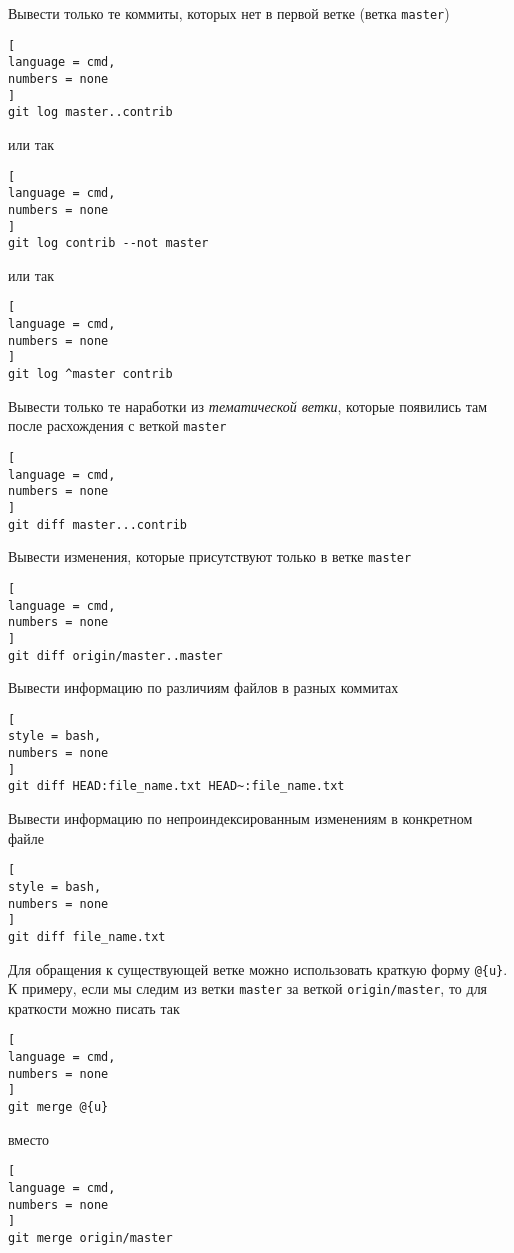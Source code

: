 \documentclass[%
	11pt,
	a4paper,
	utf8,
		]{article}
\begin{document}
Вывести только те коммиты, которых нет в первой ветке (ветка \texttt{master})

\begin{lstlisting}[
language = cmd,
numbers = none
]
git log master..contrib
\end{lstlisting}
или так
\begin{lstlisting}[
language = cmd,
numbers = none
]
git log contrib --not master
\end{lstlisting}
или так
\begin{lstlisting}[
language = cmd,
numbers = none
]
git log ^master contrib
\end{lstlisting}


Вывести только те наработки из \emph{тематической ветки}, которые появились там после расхождения с веткой \texttt{master}

\begin{lstlisting}[
language = cmd,
numbers = none
]
git diff master...contrib
\end{lstlisting}

Вывести изменения, которые присутствуют только в ветке \texttt{master}

\begin{lstlisting}[
language = cmd,
numbers = none
]
git diff origin/master..master
\end{lstlisting}

Вывести информацию по различиям файлов в разных коммитах
\begin{lstlisting}[
style = bash,
numbers = none
]
git diff HEAD:file_name.txt HEAD~:file_name.txt
\end{lstlisting}

Вывести информацию по непроиндексированным изменениям в конкретном файле
\begin{lstlisting}[
style = bash,
numbers = none
]
git diff file_name.txt
\end{lstlisting}

Для обращения к существующей ветке можно использовать краткую форму \texttt{@\{u\}}. К примеру, если мы следим из ветки \texttt{master} за веткой \texttt{origin/master}, то для краткости можно писать так

\begin{lstlisting}[
language = cmd,
numbers = none
]
git merge @{u}
\end{lstlisting}
вместо
\begin{lstlisting}[
language = cmd,
numbers = none
]
git merge origin/master
\end{lstlisting}
\end{document}
